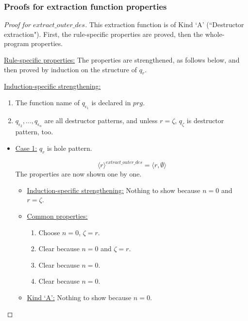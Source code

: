 \documentclass[11pt]{article} %
\begin{document}
\subsubsection{Proofs for extraction function properties}

\begin{proof}[Proof for $extract\_outer\_des$]

This extraction function is of Kind `A' (``Destructor extraction"). First, the rule-specific properties are proved, then the whole-program properties.

\underline{Rule-specific properties:} The properties are strengthened, as follows below, and then proved by induction on the structure of $q_r$.

\underline{Induction-specific strengthening:}
\begin{enumerate}
\item The function name of $q_{\epsilon_1}$ is declared in $prg$.
\item $q_{\epsilon_2}, ..., q_{\epsilon_n}$ are all destructor patterns, and unless $r = \zeta$, $q_\zeta$ is destructor pattern, too.
\end{enumerate}

\begin{itemize}

\item \underline{Case 1:} $q_r$ is hole pattern.

\begin{equation*}
\langle r \rangle^{extract\_outer\_des} = \big\langle r, \emptyset \big\rangle
\end{equation*}
The properties are now shown one by one.
\begin{itemize}
\item \underline{Induction-specific strengthening:} Nothing to show because $n = 0$ and $r = \zeta$.

\item \underline{Common properties:}
\begin{enumerate}
\item Choose $n = 0$, $\zeta = r$.
\item Clear because $n = 0$ and $\zeta = r$.
\item Clear because $n = 0$.
\item Clear because $n = 0$.
\end{enumerate}

\item \underline{Kind `A':} Nothing to show because $n = 0$.
\end{itemize}


\end{itemize}
\end{proof}
\end{document}
